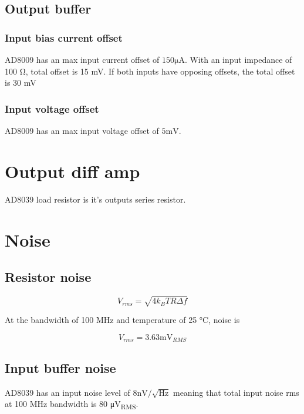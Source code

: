 \documentclass[11pt]{article}
\begin{document}
\subsection{Output buffer}
\subsubsection{Input bias current offset}
AD8009 has an max input current offset of $150 \si{\micro \ampere}$. With an input impedance of 
100 \si{\ohm}, total offset is 15 mV. If both inputs have opposing offsets, the total offset is 30 mV

\subsubsection{Input voltage offset}
AD8009 has an max input voltage offset of $5 \si{\milli \volt}$.

\section{Output diff amp}
AD8039 load resistor is it's outputs series resistor. 

\section{Noise}

\subsection{Resistor noise}


\begin{equation}
  V_{rms} = \sqrt{4 k_B T R \Delta f}
\end{equation}

At the bandwidth of 100 \si{\mega \hertz} and temperature of 25 \si{\celsius}, noise is

\begin{equation}
  V_{rms} = 3.63 \si{\milli \volt_{RMS}}
\end{equation}

\subsection{Input buffer noise}

AD8039 has an input noise level of $8 \si{\nano \volt} / \sqrt{\si{\hertz}}$ meaning 
that total input noise rms at 100 \si{\mega \hertz} bandwidth is 80 \si{\micro \volt_{RMS}}.
\end{document}
